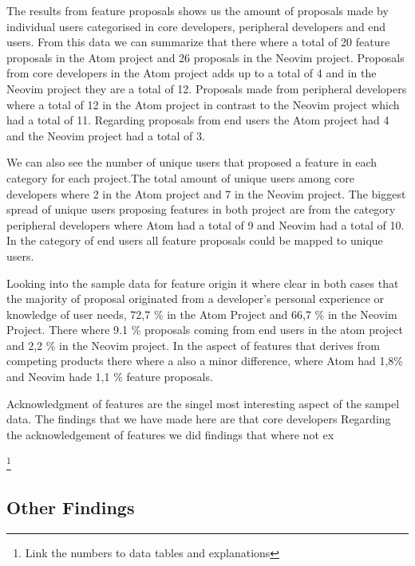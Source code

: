 \documentclass[a4paper,11pt]{article}
\begin{document}
{%
The results from feature proposals shows us the amount of proposals made by individual users categorised in core developers, peripheral developers and end users. From this data we can summarize that there where a total of 20 feature proposals in the Atom project and 26 proposals in the Neovim project. Proposals from core developers in the Atom project adds up to a total of 4 and in the Neovim project they are a total of 12. Proposals made from peripheral developers where a total of 12 in the Atom project in contrast to the Neovim project which had a total of 11. Regarding proposals from end users the Atom project had 4 and the Neovim project had a total of 3.

We can also see the number of unique users that proposed a feature in each category for each project.The total amount of unique users among core developers where 2 in the Atom project and 7 in the Neovim project. The biggest spread of unique users proposing features in both project are from the category peripheral developers where Atom had a total of 9 and Neovim had a total of 10. In the category of end users all feature proposals could be mapped to unique users.

Looking into the sample data for feature origin it where clear in both cases that the majority of proposal originated from a developer's personal experience or knowledge of user needs, 72,7 \% in the Atom Project and 66,7 \% in the Neovim Project. There where 9.1 \% proposals coming from end users in the atom project and 2,2 \% in the Neovim project. In the aspect of features that derives from competing products there where a also a minor difference, where Atom had 1,8\% and Neovim hade 1,1 \% feature proposals.

Acknowledgment of features are the singel most interesting aspect of the sampel data. The findings that we have made here are that core developers
Regarding the acknowledgement of features we did findings that where not ex




\footnote{Link the numbers to data tables and explanations}




\subsection{Other Findings}

}
\end{document}
